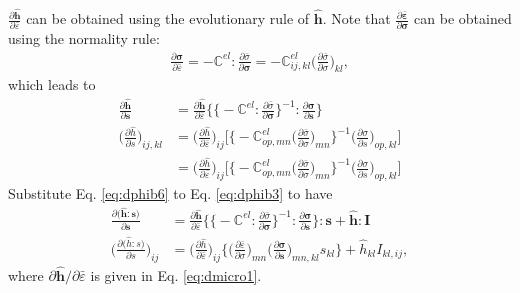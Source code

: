 \documentclass[12pt]{amsart}
\begin{document}
$\frac{\partial{\hat{\mathbf{h}}}}{\partial{\bar{\varepsilon}}} $ can be obtained using the evolutionary rule of $\hat{\mathbf{h}}$.
Note that $\frac{\partial{\bar{\mathbf{\varepsilon}}}}{\partial{\mathbf{\sigma}}}$ can be obtained using the normality rule:
\begin{eqnarray}
  \label{eq:dphib5}
  \frac{\partial{\mathbf{\sigma}}}{\partial{\bar{\varepsilon}}} = - \mathbb{C}^{el} : \frac{\partial{\bar{\sigma}}}{\partial{\mathbf{\sigma}}} = -\mathbb{C}^{el}_{ij,kl} \bigg(\frac{\partial\bar{\sigma}}{\partial\sigma}\bigg)_{kl},
\end{eqnarray}
which leads to
\begin{equation}
  \label{eq:dphib6}
  \begin{split}
    \frac{\partial\hat{\mathbf{h}}}{\partial\mathbf{s}}   &=\frac{\partial\hat{\mathbf{h}}}{\partial\bar{\varepsilon}} \bigg\{ \Big\{- \mathbb{C}^{el} : \frac{\partial\bar{\sigma}}{\partial\mathbf{\sigma}}\Big\}^{-1} :  \frac{\partial\mathbf{\sigma}}{\partial\mathbf{s}}\bigg\}\\
    \bigg(\frac{\partial\hat{h}}{\partial s}\bigg)_{ij,kl}&=\bigg(\frac{\partial\hat{h}}{\partial\bar{\varepsilon}}\bigg)_{ij} \bigg[ \bigg\{- \mathbb{C}^{el}_{op,mn} \Big(\frac{\partial\bar{\sigma}}{\partial\sigma}\Big)_{mn}\bigg\}^{-1} \bigg(\frac{\partial\sigma}{\partial s}\bigg)_{op,kl}\bigg]\\
                                                          &=\bigg(\frac{\partial\hat{h}}{\partial\bar{\varepsilon}}\bigg)_{ij} \bigg[ \bigg\{- \mathbb{C}^{el}_{op,mn} \Big(\frac{\partial\bar{\sigma}}{\partial\sigma}\Big)_{mn}\bigg\}^{-1} \bigg(\frac{\partial\sigma}{\partial s}\bigg)_{op,kl}\bigg]
  \end{split}
\end{equation}
Substitute Eq. \ref{eq:dphib6} to Eq. \ref{eq:dphib3} to have
\begin{equation}
  \label{eq:dphib6_1}
  \begin{split}
    \frac{\partial \big(\hat{\mathbf{h}}:\mathbf{s}\big)  }{\partial\mathbf{s}}&=\frac{\partial{\hat{\mathbf{h}}}}{\partial{\bar{\varepsilon}}}  \bigg\{ \Big\{- \mathbb{C}^{el} : \frac{\partial{\bar{\sigma}}}{\partial{\mathbf{\sigma}}}\Big\}^{-1} :  \frac{\partial{\mathbf{\sigma}}}{\partial{\mathbf{s}}}\bigg\}:\mathbf{s} + \hat{\mathbf{h}}:\mathbf{I}\\
    \bigg(\frac{\partial \big(\hat{h}:s\big)  }{\partial s}\bigg)_{ij} & = \bigg(\frac{\partial\hat{h}}{\partial\bar{\varepsilon}}\bigg)_{ij} \bigg\{\bigg(\frac{\partial\bar{\varepsilon}}{\partial\sigma}\bigg)_{mn}  \bigg(\frac{\partial{\mathbf{\sigma}}}{\partial{\mathbf{s}}}\bigg)_{mn,kl} s_{kl}\bigg\} + \hat{h}_{kl}I_{kl,ij},
  \end{split}
\end{equation}
where $\partial \hat{\mathbf{h}}/ \partial\bar{\varepsilon}$ is given in Eq. \ref{eq:dmicro1}.
\end{document}
